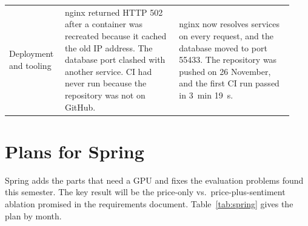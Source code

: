 {\begin{longtable}{@{}>{\raggedright\arraybackslash}p{0.17\linewidth}
                    >{\raggedright\arraybackslash}p{0.38\linewidth}
                    >{\raggedright\arraybackslash}p{0.38\linewidth}@{}}
Deployment and tooling &
nginx returned HTTP 502 after a container was recreated because it cached the
old IP address. The database port clashed with another service. CI had never
run because the repository was not on GitHub. &
nginx now resolves services on every request, and the database moved to port
55433. The repository was pushed on 26 November, and the first CI run passed in
3~min 19~s. \\

\end{longtable}
}

\section{Plans for Spring}
\label{sec:spring}

Spring adds the parts that need a GPU and fixes the evaluation problems found
this semester. The key result will be the price-only vs.\ price-plus-sentiment
ablation promised in the requirements document. Table~\ref{tab:spring} gives the
plan by month.

